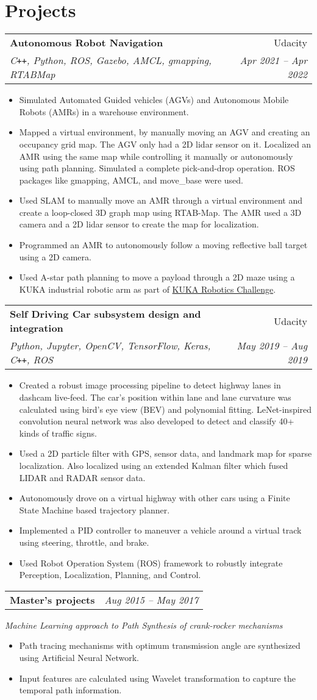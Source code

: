 \documentclass[letterpaper,10pt]{article}
\makeatletter
\newcommand{\resumeHeading}[4]{
  \vspace{-1pt}
    \begin{tabular*}{0.97\textwidth}{l@{\extracolsep{\fill}}r}
      \textbf{#1} & #2 \vspace{-2pt}\\ \vspace{1pt}
      \textit{\small#3} & \textit{\small #4} \\
    \end{tabular*}
}
\newcommand{\resumeSubheading}[1]{
	\vspace{-3pt}
      {\small\textit{#1}} \\
      \vspace{-3pt}
}
\newcommand{\resumeHeadingwithDate}[2]{
	\vspace{-1pt}
	\begin{tabular*}{0.97\textwidth}{l@{\extracolsep{\fill}}r}
		\textbf{#1} &  \textit{\small#2} \vspace{-2pt}\\
	\end{tabular*}
	\vspace{+2pt}
}
\newcommand{\resumeSection}[1]{
\vspace{-12pt}
\section{\textbf{#1}}
}
\newcommand{\resumeItemListStart}{
\vspace{-7pt}
\begin{itemize}[leftmargin=14pt]
}
\newcommand{\resumeItemListEnd}{
\vspace{+7pt}
\end{itemize}
}
\newcommand{\resumeItem}[1]{
  \item\small{
      {#1 \vspace{-7pt}
      }
  }
}
\makeatother
\begin{document}
\resumeSection{Projects}

\resumeHeading{Autonomous Robot Navigation}{Udacity}{C\texttt{++}, Python, ROS, Gazebo, AMCL, gmapping, RTABMap}{Apr 2021 -- Apr 2022}
\resumeItemListStart
\resumeItem{Simulated Automated Guided vehicles (AGVs) and Autonomous Mobile Robots (AMRs) in a warehouse environment.}
\resumeItem{Mapped a virtual environment, by manually moving an AGV and creating an occupancy grid map. The AGV only had a 2D lidar sensor on it. Localized an AMR using the same map while controlling it manually or autonomously using path planning. Simulated a complete pick-and-drop operation. ROS packages like gmapping, AMCL, and move\_base were used.}
\resumeItem{Used SLAM to manually move an AMR through a virtual environment and create a loop-closed 3D graph map using RTAB-Map. The AMR used a 3D camera and a 2D lidar sensor to create the map for localization.}
\resumeItem{Programmed an AMR to autonomously follow a moving reflective ball target using a 2D camera.}
\resumeItem{Used A-star path planning to move a payload through a 2D maze using a KUKA industrial robotic arm as part of \href{https://www.udacity.com/kuka-robotics-challenge}{KUKA Robotics Challenge}.}
\resumeItemListEnd

\resumeHeading{Self Driving Car subsystem design and integration}{Udacity}{Python, Jupyter, OpenCV, TensorFlow, Keras, C\texttt{++}, ROS}{May 2019 -- Aug 2019}
\resumeItemListStart
\resumeItem{Created a robust image processing pipeline to detect highway lanes in dashcam live-feed. The car's position within lane and lane curvature was calculated using bird's eye view (BEV) and polynomial fitting. LeNet-inspired convolution neural network was also developed to detect and classify 40+ kinds of traffic signs.}
\resumeItem{Used a 2D particle filter with GPS, sensor data, and landmark map for sparse localization. Also localized using an extended Kalman filter which fused LIDAR and RADAR sensor data.}
\resumeItem{Autonomously drove on a virtual highway with other cars using a Finite State Machine based trajectory planner.}
\resumeItem{Implemented a PID controller to maneuver a vehicle around a virtual track using steering, throttle, and brake.}
\resumeItem{Used Robot Operation System (ROS) framework to robustly integrate Perception, Localization, Planning, and Control.}
\resumeItemListEnd

\resumeHeadingwithDate{Master's projects}{Aug 2015 -- May 2017}
\resumeSubheading{Machine Learning approach to Path Synthesis of crank-rocker mechanisms}
\resumeItemListStart
\resumeItem{Path tracing mechanisms with optimum transmission angle are synthesized using Artificial Neural Network.}
\resumeItem{Input features are calculated using Wavelet transformation to capture the temporal path information.}
\resumeItemListEnd
\end{document}
